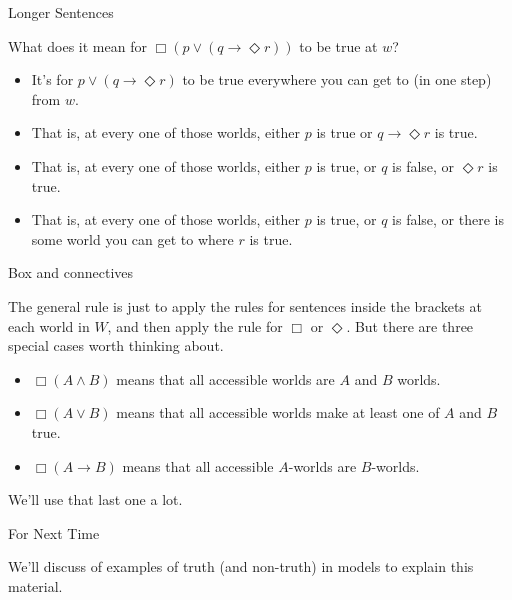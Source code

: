 \documentclass[
  ignorenonframetext,
]{beamer}
\providecommand{\tightlist}{%
  \setlength{\itemsep}{0pt}\setlength{\parskip}{0pt}}
\renewcommand{\,}{\text{, }}
\begin{document}
\begin{frame}{Longer Sentences}
\protect\hypertarget{longer-sentences}{}

What does it mean for \(\Box(p \vee (q \rightarrow \Diamond r))\) to be
true at \(w\)? \pause

\begin{itemize}
\tightlist
\item
  It's for \(p \vee (q \rightarrow \Diamond r)\) to be true everywhere
  you can get to (in one step) from \(w\).
\item
  That is, at every one of those worlds, either \(p\) is true or
  \(q \rightarrow \Diamond r\) is true.\pause
\item
  That is, at every one of those worlds, either \(p\) is true, or \(q\)
  is false, or \(\Diamond r\) is true. \pause
\item
  That is, at every one of those worlds, either \(p\) is true, or \(q\)
  is false, or there is some world you can get to where \(r\) is true.
\end{itemize}

\end{frame}

\begin{frame}{Box and connectives}
\protect\hypertarget{box-and-connectives}{}

The general rule is just to apply the rules for sentences inside the
brackets at each world in \(W\), and then apply the rule for \(\Box\) or
\(\Diamond\). But there are three special cases worth thinking about.

\begin{itemize}
\tightlist
\item
  \(\Box(A \wedge B)\) means that all accessible worlds are \(A\) and
  \(B\) worlds. \pause
\item
  \(\Box(A \vee B)\) means that all accessible worlds make at least one
  of \(A\) and \(B\) true.\pause
\item
  \(\Box(A \rightarrow B)\) means that all accessible \(A\)-worlds are
  \(B\)-worlds.
\end{itemize}

We'll use that last one a lot.

\end{frame}

\begin{frame}{For Next Time}
\protect\hypertarget{for-next-time}{}

We'll discuss of examples of truth (and non-truth) in models to explain
this material.

\end{frame}
\end{document}
